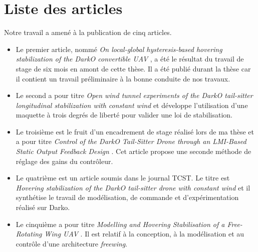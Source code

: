 \section*{Liste des articles}
Notre travail a amené à la publication de cinq articles.
\begin{itemize}
    \item Le premier article, nommé \textit{On local-global hysteresis-based hovering stabilization of the DarkO convertible UAV} \cite{sansouECC}, a été le résultat du travail de stage de six mois en amont de cette thèse. Il a été publié durant la thèse car il contient un travail préliminaire à la bonne conduite de nos travaux. 
    \item Le second a pour titre \textit{Open wind tunnel experiments of the {DarkO} tail-sitter longitudinal stabilization with constant wind} \cite{SANSOUACA} et développe l'utilisation d'une maquette à trois degrés de liberté pour valider une loi de stabilisation.
    \item Le troisième est le fruit d'un encadrement de stage réalisé lors de ma thèse et a pour titre \textit{Control of the DarkO Tail-Sitter Drone through an LMI-Based Static Output Feedback Design} \cite{a_curpanaru_et_al}. Cet article propose une seconde méthode de réglage des gains du contrôleur.
    \item Le quatrième est un article soumis dans le journal TCST. Le titre est \textit{Hovering stabilization of the DarkO tail-sitter drone with constant wind} \cite{sansouTCST} et il synthétise le travail de modélisation, de commande et d'expérimentation réalisé sur Darko.
    \item Le cinquième a pour titre \textit{Modelling and Hovering Stabilisation of a Free-Rotating Wing UAV} \cite{sansouICUAS}. Il est relatif à la conception, à la modélisation et au contrôle d'une architecture \textit{freewing}. 
\end{itemize}








\renewcommand{\thefigure}{\thechapter.\arabic{figure}}


